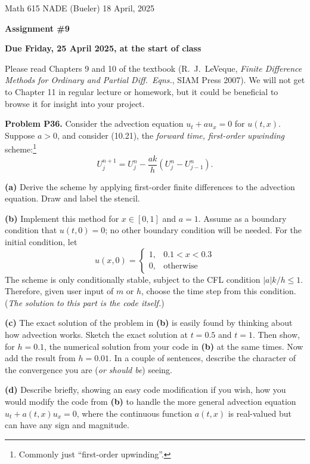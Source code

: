 \documentclass[12pt]{amsart}
\newcommand{\prob}[1]{\bigskip\noindent\textbf{#1}\quad }
\newcommand{\epart}[1]{\medskip\noindent\textbf{(#1)}\quad }
\begin{document}
\scriptsize \noindent Math 615 NADE (Bueler) \hfill 18 April, 2025
\normalsize

\medskip\bigskip

\Large\centerline{\textbf{Assignment \#9}}
\large
\bigskip

\centerline{\textbf{Due Friday, 25 April 2025, at the start of class}}
\bigskip
\normalsize

\thispagestyle{empty}

\bigskip
Please read Chapters 9 and 10 of the textbook (R.~J.~LeVeque, \emph{Finite Difference Methods for Ordinary and Partial Diff.~Eqns.}, SIAM Press 2007).  We will not get to Chapter 11 in regular lecture or homework, but it could be beneficial to browse it for insight into your project.

\medskip

\prob{Problem P36.}  Consider the advection equation $u_t + a u_x = 0$ for $u(t,x)$.  Suppose $a>0$, and consider (10.21), the \emph{forward time, first-order upwinding} scheme:\footnote{Commonly just ``first-order upwinding''.}
    $$U_j^{n+1} = U_j^{n} - \frac{ak}{h}(U_{j}^n - U_{j-1}^n).$$

\epart{a}  Derive the scheme by applying first-order finite differences to the advection equation.  Draw and label the stencil.

\epart{b}  Implement this method for $x\in[0,1]$ and $a = 1$.  Assume as a boundary condition that $u(t,0)=0$; no other boundary condition will be needed.  For the initial condition, let
    $$u(x,0)=\begin{cases} 1, & 0.1 < x < 0.3 \\ 0, & \text{otherwise} \end{cases}$$
The scheme is only conditionally stable, subject to the CFL condition $|a|k/h \le 1$.  Therefore, given user input of $m$ or $h$, choose the time step from this condition.  (\emph{The solution to this part is the code itself.})

\epart{c}  The exact solution of the problem in \textbf{(b)} is easily found by thinking about how advection works.  Sketch the exact solution at $t=0.5$ and $t=1$.  Then show, for $h=0.1$, the numerical solution from your code in \textbf{(b)} at the same times.  Now add the result from $h=0.01$.  In a couple of sentences, describe the character of the convergence you are (\emph{or should be}) seeing.

\epart{d}  Describe briefly, showing an easy code modification if you wish, how you would modify the code from \textbf{(b)} to handle the more general advection equation $u_t + a(t,x) u_x = 0$, where the continuous function $a(t,x)$ is real-valued but can have any sign and magnitude.
\end{document}
